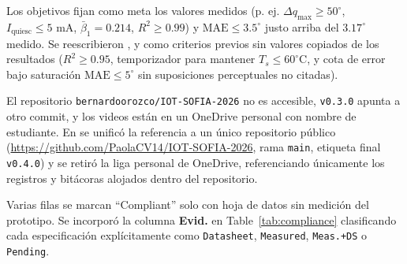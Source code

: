 \documentclass{LabDSTresponse}
\begin{document}
{Los objetivos fijan como meta los valores medidos (p. ej. $\Delta q_{\max} \ge 50^\circ$, $I_{\text{quiesc}} \le 5\text{ mA}$, $\bar{\beta}_1 = 0.214$, $R^2 \ge 0.99$) y $\text{MAE} \le 3.5^\circ$ justo arriba del $3.17^\circ$ medido.}
{Se reescribieron ,  y  como criterios previos sin valores copiados de los resultados ($R^2 \ge 0.95$, temporizador para mantener $T_s \le 60^\circ\text{C}$, y cota de error bajo saturación $\text{MAE} \le 5^\circ$ sin suposiciones perceptuales no citadas).}

{El repositorio \texttt{bernardoorozco/IOT-SOFIA-2026} no es accesible, \texttt{v0.3.0} apunta a otro commit, y los videos están en un OneDrive personal con nombre de estudiante.}
{En  se unificó la referencia a un único repositorio público (\url{https://github.com/PaolaCV14/IOT-SOFIA-2026}, rama \texttt{main}, etiqueta final \texttt{v0.4.0}) y se retiró la liga personal de OneDrive, referenciando únicamente los registros y bitácoras alojados dentro del repositorio.}

{Varias filas se marcan “Compliant” solo con hoja de datos sin medición del prototipo.}
{Se incorporó la columna \textbf{Evid.} en Table~\ref{tab:compliance} clasificando cada especificación explícitamente como \texttt{Datasheet}, \texttt{Measured}, \texttt{Meas.+DS} o \texttt{Pending}.}
\end{document}
